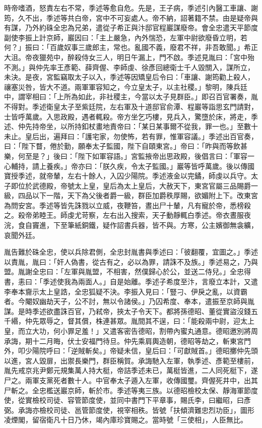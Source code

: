 \begin{pinyinscope}
 時帝嗜酒，怒責左右不常，季述等愈自危。先是，王子病，季述引內醫工車讓、謝筠，久不出，季述等共白帝，宮中不可妄處人。帝不納，詔著籍不禁。由是疑帝與有謀，乃外約硃全忠為兄弟，遣從子希正與汴邸官程巖謀廢帝。會全忠遣天平節度副使李振上計京師，巖因曰：「主上嚴急，內外惴恐，左軍中尉欲廢昏立明，若何？」振曰：「百歲奴事三歲郎主，常也。亂國不義，廢君不祥，非吾敢聞。」希正大沮。帝夜獵苑中，醉殺侍女三人，明日午漏上，門不啟。季述見胤曰：「宮中殆不測。」與仲先率王彥範、薛齊偓、李師虔、徐彥回總衛士千人毀關入，謀所立，未決。是夜，宮監竊取太子以入，季述等因矯皇后令曰：「車讓、謝筠勸上殺人，禳塞災咎，皆大不道。兩軍軍容知之，今立皇太子，以主社稷。」黎明，陳兵廷中，謂宰相曰：「上所為如此，非社稷主，今當以太子見群臣。」即召百官署奏，胤不得對。季述衛皇太子至紫廷院，左右軍及十道邸官俞潭、程巖等詣思玄門請對，士皆呼萬歲。入思政殿，遇者輒殺。帝方坐乞巧樓，見兵入，驚墮於床，將走，季述、仲先持帝坐，以所持釦杖畫地責帝曰：「某日某事爾不從我，罪一也。」至數十未止。皇后出，遍拜曰：「護宅家，勿使怖，若有罪，惟軍容議。」季述出百官奏，曰：「陛下瞀，倦於勤，願奉太子監國，陛下自頤東宮。」帝曰：「昨與而等飲甚樂，何至是？」後曰：「陛下如軍容語。」宮監掖帝出思政殿，後倡言曰：「軍容一心輔持，請上養疾。」帝亦曰：「朕久疾，令太子監國。」巖等皆呼萬歲。後以傳國寶授季述，就帝輦，左右十餘人，入囚少陽院。季述液金以完鐍，師虔以兵守。太子即位於武德殿，帝號太上皇，皇后為太上皇后，大赦天下，東宮官屬三品賜爵一級，四品以下一階，天下為父後者爵一級，群臣加爵秩厚賜，欲媚附上下。改東宮為問安宮。季述等皆先誅戮以立威，夜鞭笞，晝出尸十輦，凡有寵於帝，悉榜殺之。殺帝弟睦王。師虔尤苛察，左右出入搜索，天子動靜輒白季述。帝衣晝服夜浣，食自竇進，下至筆紙銅鐵，疑作詔書兵器，皆不與。方寒，公主嬪御無衾纊，哀聞外廷。



 胤告難於硃全忠，使以兵除君側，全忠封胤書與季述曰：「彼翻覆，宜圖之。」季述以責胤，胤曰：「奸人偽書，從古有之，必以為罪，請誅不及族。」季述易之，乃與盟。胤謝全忠曰：「左軍與胤盟，不相害，然僕歸心於公，並送二侍兒。」全忠得書，恚曰：「季述使我為兩面人。」自是始離。季述子希度至汴，言廢立本計，又遣李奉本齎示太上皇誥，全忠狐疑不決。李振入見曰：「豎刁、伊戾之亂，以資霸者。今閹奴幽劫天子，公不討，無以令諸侯。」乃囚希度、奉本，遣振至京師與胤謀。是時季述欲盡誅百官，乃弒帝，挾太子令天下。都將孫德昭、董從實盜沒錢五千緡，仲先眾辱之，督其償，株連甚眾。胤間其不逞，曰：「能殺兩中尉，迎太上皇，而立大功，何小罪足羞！」又遣客密告德昭，割帶內蜜丸通意。德昭邀別將周承誨，期十二月晦，伏士安福門待旦。仲先乘肩輿造朝，德昭等劫之，斬東宮門外，叩少陽院呼曰：「逆賊斬矣。」帝疑未信，皇后曰：「可獻賊首。」德昭擲仲先頭以進，宮人毀扉，出禦長樂門，群臣稱賀。承誨馳入左軍，執季述、彥範至樓前，胤先戒京兆尹鄭元規集萬人持大梃，帝詰季述未已，萬梃皆進，二人同死梃下，遂尸之。兩軍支黨死者數十人。中官奉太子遁入左軍，收傳國璽。齊偓死井中，出其尸斬之。全忠檻送巖京師，斬於市。季述等夷三族。以德昭檢校太保、靜海軍節度使，從實檢校司徒、容管節度使，並同中書門下平章事，賜氏李，曰繼昭，曰彥弼。承誨亦檢校司徒、邕管節度使，視宰相秩。皆號「扶傾濟難忠烈功臣」，圖形凌煙閣，留宿衛凡十日乃休，竭內庫珍寶賜之。當時號「三使相」，人臣無比。




\end{pinyinscope}
